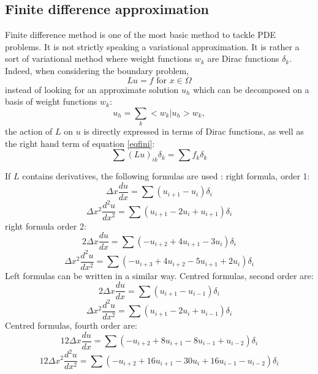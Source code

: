 \documentclass[12pt]{book}
\begin{document}
\subsection{Finite difference approximation}
Finite difference method is one of the most basic method to tackle PDE
problems. It is not strictly speaking a variational approximation. It is rather
a sort of variational method where weight functions $w_k$ are Dirac
functions $\delta_k$. Indeed,
when considering the boundary problem,
\begin{equation}\label{eqfini}
Lu=f \mbox{  for  }x\in \Omega
\end{equation}
instead of looking for an approximate solution $u_h$ which can be decomposed
on a basis of weight functions $w_k$:
\begin{equation}
u_h=\sum_k<w_k|u_h>w_k,
\end{equation}
the action of $L$ on $u$ is directly expressed in terms of Dirac functions, as
well as the right hand term of equation \ref{eqfini}:
\begin{equation}\label{eqfini2}
\sum (Lu)_{ik} \delta_k=\sum f_k\delta_k
\end{equation}
\begin{rem}
If $L$ contains
derivatives, the following formulas are used :
right formula, order 1:
\begin{equation}
\Delta x\frac{du}{dx}=\sum (u_{i+1}-u_i)\delta_i
\end{equation}
\begin{equation}
\Delta x^2\frac{d^2u}{dx^2}=\sum (u_{i+1}-2u_i+u_{i+1})\delta_i
\end{equation}
right formula order 2:
\begin{equation}
2\Delta x\frac{du}{dx}=\sum (-u_{i+2}+4u_{i+1}-3u_i)\delta_i
\end{equation}
\begin{equation}
\Delta x^2\frac{d^2u}{dx^2}=\sum (-u_{i+3}+4u_{i+2}-5u_{i+1}+2u_i)\delta_i
\end{equation}
Left formulas can be written in a similar way. Centred formulas, second order
are:
\begin{equation}
2\Delta x\frac{du}{dx}=\sum (u_{i+1}-u_{i-1})\delta_i
\end{equation}
\begin{equation}
\Delta x^2\frac{d^2u}{dx^2}=\sum (u_{i+1}-2u_{i}+u_{i-1})\delta_i
\end{equation}
Centred formulas, fourth order are:
\begin{equation}
12\Delta x\frac{du}{dx}=\sum (-u_{i+2}+8u_{i+1}-8u_{i-1}+u_{i-2})\delta_i
\end{equation}
\begin{equation}
12\Delta x^2\frac{d^2u}{dx^2}=\sum
(-u_{i+2}+16u_{i+1}-30u_i+16u_{i-1}-u_{i-2})\delta_i 
\end{equation}
\end{rem}
\end{document}
